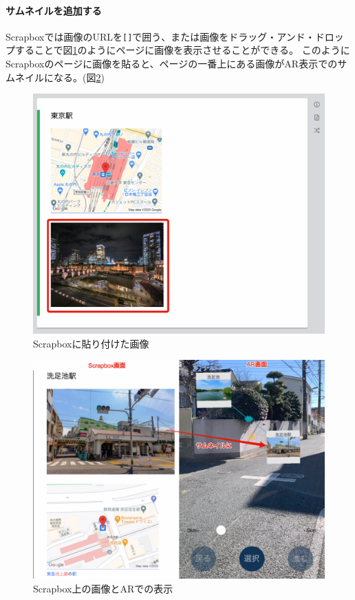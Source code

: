 \paragraph*{サムネイルを追加する}
Scrapboxでは画像のURLを\texttt{[]}で囲う、または画像をドラッグ・アンド・ドロップすることで図\ref{fig:scrapbox_thumbnail}のようにページに画像を表示させることができる。
このようにScrapboxのページに画像を貼ると、ページの一番上にある画像がAR表示でのサムネイルになる。(図\ref{fig:scrapbox_thumbnail_and_ar})

\begin{figure}[H]
  \centering
  \includegraphics[width=120mm]{images/scrapbox_thumbnail.png}
  \caption{Scrapboxに貼り付けた画像} \label{fig:scrapbox_thumbnail}
\end{figure}

\begin{figure}[H]
  \centering
  \includegraphics[width=120mm]{images/scrapbox_thumbnail_and_ar.png}
  \caption{Scrapbox上の画像とARでの表示} \label{fig:scrapbox_thumbnail_and_ar}
\end{figure}

